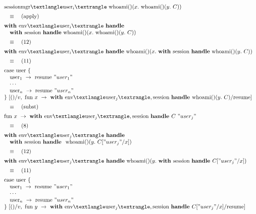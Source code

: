\documentclass[logo,bsc,singlespacing,parskip]{infthesis}
\begin{document}
\[
\begin{array}{l}
\text{sessionmgr}⟨\text{user}_i⟩\ \text{whoami}()(x.\ \text{whoami}()(y.\ C)) \\[5pt]

\quad\equiv\quad (\text{apply}) \\[5pt]
\textbf{with } \text{env}⟨\text{user}_i⟩\ \textbf{handle} \\
\quad \textbf{with } \text{session}\ \textbf{handle}\ \text{whoami}()(x.\ \text{whoami}()(y.\ C)) \\[5pt]

\quad\equiv\quad (12) \\[5pt]
\textbf{with } \text{env}⟨\text{user}_i⟩\ \textbf{handle}\ \text{whoami}()(x.\ \textbf{with } \text{session}\ \textbf{handle}\ \text{whoami}()(y.\ C)) \\[5pt]

\quad\equiv\quad (11) \\[5pt]
\text{case user \{} \\
\quad \text{user}_1\ \rightarrow\ \text{resume } "user_1" \\
\quad \cdots \\
\quad \text{user}_n\ \rightarrow\ \text{resume } "user_n" \\
\text{\}}\ [()/v,\ \text{fun } x\ \rightarrow\ \textbf{with } \text{env}⟨\text{user}_j⟩, \text{session}\ \textbf{handle } \text{whoami}()(y.\ C)/\text{resume}] \\[5pt]

\quad\equiv\quad (\text{subst}) \\[5pt]
\text{fun } x\ \rightarrow\ \textbf{with } \text{env}⟨\text{user}_j⟩, \text{session}\ \textbf{handle } C\ "user_j" \\[5pt]

\quad\equiv\quad (8) \\[5pt]
\textbf{with } \text{env}⟨\text{user}_j⟩\ \textbf{handle} \\
\quad \textbf{with } \text{session}\ \textbf{handle }\ \text{whoami}()(y.\ C["user_j"/x]) \\[5pt]

\quad\equiv\quad (12) \\[5pt]
\textbf{with } \text{env}⟨\text{user}_j⟩\ \textbf{handle}\ \text{whoami}()(y.\ \textbf{with } \text{session}\ \textbf{handle } C["user_j"/x]) \\[5pt]

\quad\equiv\quad (11) \\[5pt]
\text{case user \{} \\
\quad \text{user}_1\ \rightarrow\ \text{resume } "user_1" \\
\quad \cdots \\
\quad \text{user}_n\ \rightarrow\ \text{resume } "user_n" \\
\text{\}}\ [()/v,\ \text{fun } y\ \rightarrow\ \textbf{with } \text{env}⟨\text{user}_j⟩, \text{session}\ \textbf{handle } C["user_j"/x] / \text{resume}] \\[5pt]


\end{array}\]
\end{document}
